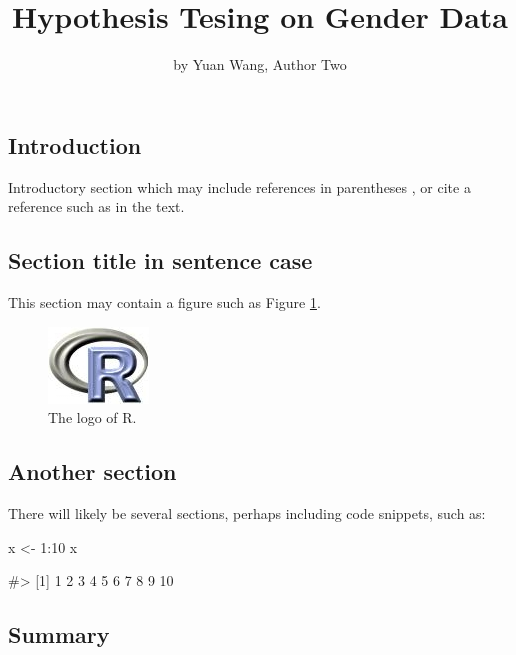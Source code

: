 \title{Hypothesis Tesing on Gender Data}
\author{by Yuan Wang, Author Two}

\maketitle


\subsection{Introduction}\label{introduction}

Introductory section which may include references in parentheses
\citep{R}, or cite a reference such as \citet{R} in the text.

\subsection{Section title in sentence
case}\label{section-title-in-sentence-case}

This section may contain a figure such as Figure \ref{figure:rlogo}.

\begin{figure}[htbp]
  \centering
  \includegraphics{Rlogo}
  \caption{The logo of R.}
  \label{figure:rlogo}
\end{figure}

\subsection{Another section}\label{another-section}

There will likely be several sections, perhaps including code snippets,
such as:

\begin{Schunk}
\begin{Sinput}
x <- 1:10
x
\end{Sinput}
\begin{Soutput}
#>  [1]  1  2  3  4  5  6  7  8  9 10
\end{Soutput}
\end{Schunk}

\subsection{Summary}\label{summary}

